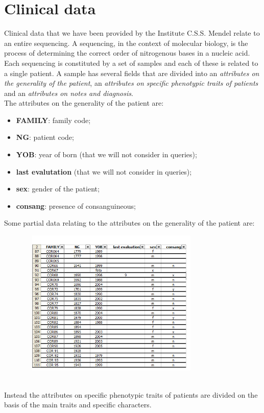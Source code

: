 \documentclass[a4paper]{report}
\begin{document}
\section{Clinical data}
Clinical data that we have been provided by the Institute C.S.S. Mendel relate to an entire sequencing. A sequencing, in the context of molecular biology, is the process of determining the correct order of nitrogenous bases in a nucleic acid. Each sequencing is constituted by a set of samples and each of these is related to a single patient.
A sample has several fields that are divided into an \textit{attributes on the generality of the patient}, an \textit{attributes on specific phenotypic traits of patients} and an \textit{attributes on notes and diagnosis}.\\
The attributes on the generality of the patient are:
\begin{itemize}
   \item \textbf{FAMILY}: family code;
    \item \textbf{NG}: patient code;
    \item \textbf{YOB}: year of born (that we will not consider in queries);
    \item \textbf{last evalutation}  (that we will not consider in queries);
    \item \textbf{sex}: gender of the patient;
    \item \textbf{consang}: presence of consanguineous;
\end{itemize}
Some partial data relating to the attributes on the generality of the patient are:
\begin{figure}[h]
\centering
\includegraphics[height=7cm, width=9cm]{attrGeneralitaPaziente.jpg}
\end{figure}
\\
Instead the attributes on specific phenotypic traits of patients are divided on the basis of the main traits and specific characters. 
\end{document}
